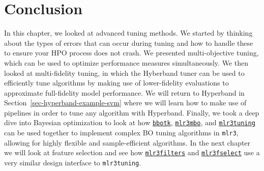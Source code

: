 \hypertarget{conclusion-3}{%
\section{Conclusion}\label{conclusion-3}}

In this chapter, we looked at advanced tuning methods. We started by
thinking about the types of errors that can occur during tuning and how
to handle these to ensure your HPO process does not crash. We presented
multi-objective tuning, which can be used to optimize performance
measures simultaneously. We then looked at multi-fidelity tuning, in
which the Hyberband tuner can be used to efficiently tune algorithms by
making use of lower-fidelity evaluations to approximate full-fidelity
model performance. We will return to Hyperband in
Section~\ref{sec-hyperband-example-svm} where we will learn how to make
use of pipelines in order to tune any algorithm with Hyperband. Finally,
we took a deep dive into Bayesian optimization to look at how
\href{https://bbotk.mlr-org.com}{\texttt{bbotk}},
\href{https://mlr3mbo.mlr-org.com}{\texttt{mlr3mbo}},
and
\href{https://mlr3tuning.mlr-org.com}{\texttt{mlr3tuning}}
can be used together to implement complex BO tuning algorithms in
\texttt{mlr3}, allowing for highly flexible and sample-efficient
algorithms. In the next chapter we will look at feature selection and
see how
\href{https://mlr3filters.mlr-org.com}{\texttt{mlr3filters}}
and
\href{https://mlr3fselect.mlr-org.com}{\texttt{mlr3fselect}}
use a very similar design interface to \texttt{mlr3tuning}.

